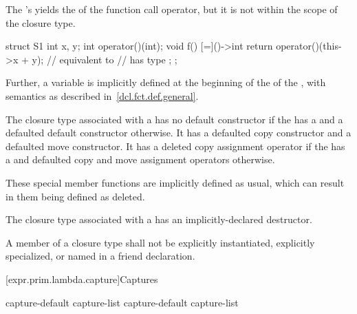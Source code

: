\pnum
The 's  yields
the  of the function call operator,
but it is not within the scope of the closure type.
\begin{example}
\begin{codeblock}
struct S1 {
  int x, y;
  int operator()(int);
  void f() {
    [=]()->int {
      return operator()(this->x + y);   // equivalent to 
                                        //  has type 
    };
  }
};
\end{codeblock}
\end{example}
Further, a variable  is implicitly defined at the beginning of
the  of the ,
with semantics as described in~\ref{dcl.fct.def.general}.

\pnum
The closure type associated with a  has no
default constructor
if the  has a 
and a defaulted default constructor otherwise.
It has a defaulted copy constructor and a defaulted move constructor.
It has a deleted copy assignment operator if the 
has a  and defaulted copy and move assignment
operators otherwise.
\begin{note}
These special member functions are implicitly defined as
usual, which can result in them being defined as deleted.
\end{note}

\pnum
The closure type associated with a  has an
implicitly-declared destructor.

\pnum
A member of a closure type shall not be
explicitly instantiated,
explicitly specialized, or
named in a friend declaration.

[expr.prim.lambda.capture]{Captures}%

\begin{bnf}
\br
    capture-default\br
    capture-list\br
    capture-default \terminal{,} capture-list
\end{bnf}

\begin{bnf}
\br
    \terminal{\&}\br
    \terminal{=}
\end{bnf}

